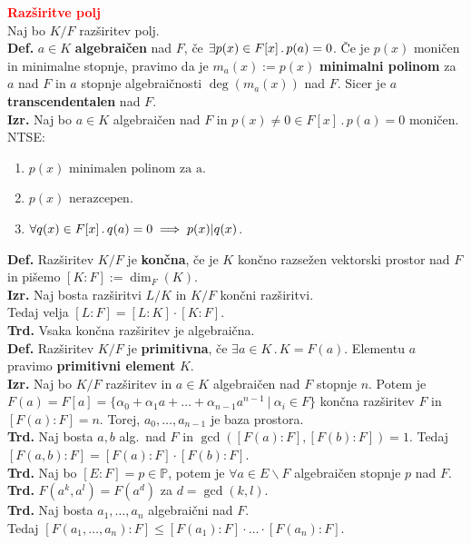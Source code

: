 \documentclass[a4paper,oneside,8pt,landscape]{extarticle}
\begin{document}
\begin{multicols*}{3}
%
\textbf{\textcolor{red}{Razširitve polj}}\\
Naj bo $K/ F$ razširitev polj.\\
\textbf{Def.} $a\in K$ \textbf{algebraičen} nad $F$, če $\exists p(x)\in F[x] \,.\, p(a)=0$. Če je $p(x)$ moničen in minimalne stopnje, pravimo da je $m_a(x):=p(x)$ \textbf{minimalni polinom} za $a$ nad $F$ in $a$ stopnje algebraičnosti $\deg(m_a(x))$ nad $F$. Sicer je \(a\) \textbf{transcendentalen} nad $F$.\\
%
\textbf{Izr.} Naj bo $a\in K$ algebraičen nad $F$ in $p(x)\neq 0\in F[x]\,.\,p(a)=0$ moničen. NTSE:
\begin{enumerate}
    \item $p(x) \text{ minimalen polinom za a}$.
    \item $p(x) \text{ nerazcepen}$.
    \item $\forall q(x)\in F[x] \,.\, q(a)=0\implies p(x)\vert q(x)$.
\end{enumerate}
\textbf{Def.} Razširitev $K/F$ je \textbf{končna}, če je $K$ končno razsežen vektorski prostor nad $F$ in pišemo $[K:F]:=\dim_F(K)$.\\
\textbf{Izr.} Naj bosta razširitvi $L/K$ in $K/F$ končni razširitvi.\\ Tedaj velja $[L:F] = [L:K]\cdot [K:F]$.\\
%
\textbf{Trd.} Vsaka končna razširitev je algebraična.\\
%
\textbf{Def.} Razširitev $K/F$ je \textbf{primitivna}, če $\exists a\in K\,.\, K = F(a)$. Elementu $a$ pravimo \textbf{primitivni element} $K$.\\
%
\textbf{Izr.} Naj bo $K/F$ razširitev in $a\in K$ algebraičen nad $F$ stopnje $n$. Potem je $F(a) = F[a] = \{\alpha_0 + \alpha_1a+\dots + \alpha_{n-1}a^{n-1} \ | \ \alpha_i \in F\}$ končna razširitev $F$ in $[F(a):F] = n$. Torej, \(a_0, \ldots, a_{n-1}\) je baza prostora.\\
%
\textbf{Trd.} Naj bosta $a,b$ alg.\ nad $F$ in $\gcd([F(a):F], [F(b):F]) = 1$. Tedaj $[F(a,b):F] = [F(a):F]\cdot [F(b):F]$.\\
%
\textbf{Trd.} Naj bo $[E:F]=p\in\mathbb{P}$, potem je $\forall a\in E\backslash F$ algebraičen stopnje $p$ nad $F$.\\
%
\textbf{Trd.} $F(a^k, a^l) = F(a^d)$ za $d=\gcd(k,l)$.\\
%
\textbf{Trd.} Naj bosta $a_1,\dots,a_n$ algebraični nad $F$.\\ Tedaj $[F(a_1,\dots,a_n):F]\leq [F(a_1):F]\cdot \ldots \cdot [F(a_n):F]$.\\

\end{multicols*}
\end{document}
